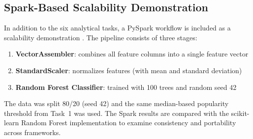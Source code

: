 \subsection{Spark-Based Scalability Demonstration}
In addition to the six analytical tasks, a PySpark workflow is included as a scalability demonstration \cite{zaharia2016spark}. The pipeline consists of three stages:
\begin{enumerate}[leftmargin=1.5em]
    \item \textbf{VectorAssembler}: combines all feature columns into a single feature vector
    \item \textbf{StandardScaler}: normalizes features (with mean and standard deviation)
    \item \textbf{Random Forest Classifier}: trained with 100 trees and random seed 42
\end{enumerate}

The data was split 80/20 (seed 42) and the same median-based popularity threshold from Task~1 was used. The Spark results are compared with the scikit-learn Random Forest implementation to examine consistency and portability across frameworks.
